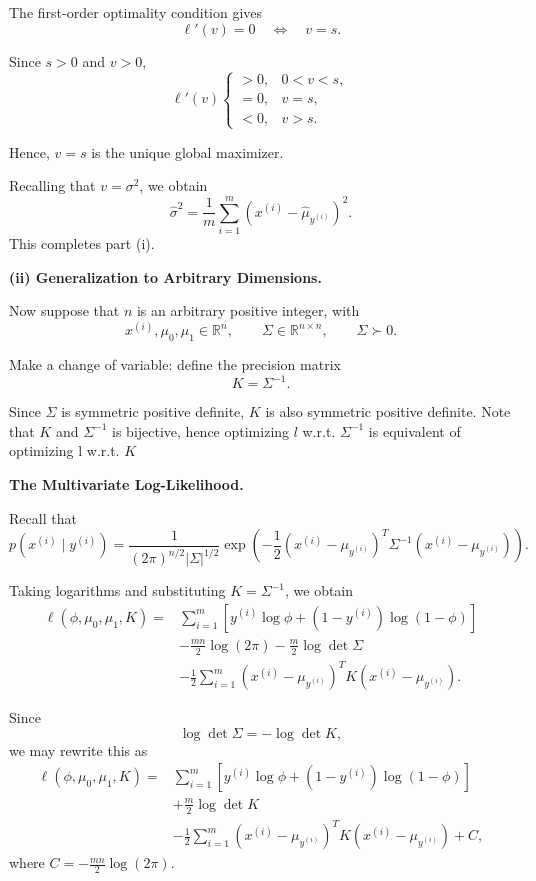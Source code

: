 \documentclass[10pt]{article}
\begin{document}
\begin{enumerate}
\begin{enumerate}[label=(\alph*)]
The first-order optimality condition gives
\[
\ell'(v)=0
\quad\Longleftrightarrow\quad
v=s.
\]

Since $s>0$ and $v>0$,
\[
\ell'(v)
\begin{cases}
>0, & 0<v<s,\\
=0, & v=s,\\
<0, & v>s.
\end{cases}
\]

Hence, $v=s$ is the unique global maximizer.

Recalling that $v=\sigma^2$, we obtain
\[
\boxed{
\hat{\sigma}^2
=
\frac{1}{m}
\sum_{i=1}^{m}
(x^{(i)}-\hat{\mu}_{y^{(i)}})^2.
}
\]
This completes part (i).

\medskip

\noindent\colorbox{yellow!20}{\textbf{(ii) Generalization to Arbitrary Dimensions.}}

Now suppose that $n$ is an arbitrary positive
integer, with
\[
x^{(i)},\mu_0,\mu_1\in\mathbb{R}^{n},
\qquad
\Sigma\in\mathbb{R}^{n\times n},
\qquad
\Sigma\succ0.
\]

Make a change of variable: define the precision matrix
\[
\boxed{
K=\Sigma^{-1}.
}
\]

Since $\Sigma$ is symmetric positive definite,
$K$ is also symmetric positive definite. Note that $K$ and $\Sigma^{-1}$ is bijective,
hence optimizing $l$ w.r.t. $\Sigma^{-1}$ is equivalent of optimizing l w.r.t. $K$

\medskip
\noindent\textbf{The Multivariate Log-Likelihood.}

Recall that
\[
p(x^{(i)}\mid y^{(i)})
=
\frac{1}{
(2\pi)^{n/2}|\Sigma|^{1/2}
}
\exp\left(
-\frac{1}{2}
(x^{(i)}-\mu_{y^{(i)}})^T
\Sigma^{-1}
(x^{(i)}-\mu_{y^{(i)}})
\right).
\]

Taking logarithms and substituting
$K=\Sigma^{-1}$, we obtain
\[
\begin{aligned}
\ell(\phi,\mu_0,\mu_1,K)
={}&
\sum_{i=1}^{m}
\left[
y^{(i)}\log\phi
+
(1-y^{(i)})\log(1-\phi)
\right]
\\[4pt]
&-
\frac{mn}{2}\log(2\pi)
-
\frac{m}{2}\log\det\Sigma
\\[4pt]
&-
\frac{1}{2}
\sum_{i=1}^{m}
(x^{(i)}-\mu_{y^{(i)}})^T
K
(x^{(i)}-\mu_{y^{(i)}}).
\end{aligned}
\]

Since
\[
\log\det\Sigma
=
-\log\det K,
\]
we may rewrite this as
\[
\boxed{
\begin{aligned}
\ell(\phi,\mu_0,\mu_1,K)
={}&
\sum_{i=1}^{m}
\left[
y^{(i)}\log\phi
+
(1-y^{(i)})\log(1-\phi)
\right]
\\[4pt]
&+
\frac{m}{2}\log\det K
\\[4pt]
&-
\frac{1}{2}
\sum_{i=1}^{m}
(x^{(i)}-\mu_{y^{(i)}})^T
K
(x^{(i)}-\mu_{y^{(i)}})
+C,
\end{aligned}
}
\]
where $C=-\frac{mn}{2}\log(2\pi)$.


\end{enumerate}
\end{enumerate}
\end{document}
